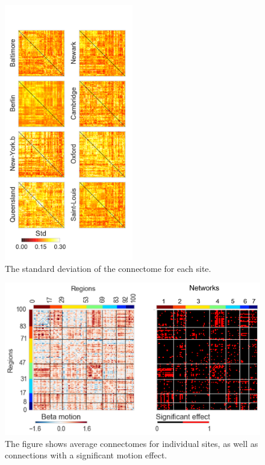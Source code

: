 \documentclass[authoryear]{elsarticle}
\begin{document}
\begin{figure}[htbp]
\centering
\includegraphics[width=0.50\textwidth]{../figures/connectome_std_multisite2.pdf}
\caption[]{
The standard deviation of the connectome for each site.
}
\label{fig_std_connectomes}
\end{figure}


\begin{figure}[htbp]
\begin{center}
\includegraphics[width=\linewidth]{../figures/effect_motion.png}
\end{center}
\caption[Connectome variability across sites]{
The figure shows average connectomes for individual sites, as well as connections with a significant motion effect.
}
\label{fig_connectome_variability_motion}
\end{figure}
\end{document}
